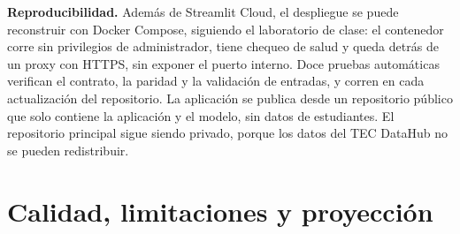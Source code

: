 \documentclass[11pt,a4paper]{article}
\begin{document}
\textbf{Reproducibilidad.} Además de Streamlit Cloud, el despliegue se puede reconstruir con Docker Compose, siguiendo el laboratorio de clase: el contenedor corre sin privilegios de administrador, tiene chequeo de salud y queda detrás de un proxy con HTTPS, sin exponer el puerto interno. Doce pruebas automáticas verifican el contrato, la paridad y la validación de entradas, y corren en cada actualización del repositorio. La aplicación se publica desde un repositorio público que solo contiene la aplicación y el modelo, sin datos de estudiantes. El repositorio principal sigue siendo privado, porque los datos del TEC DataHub no se pueden redistribuir.

\section{Calidad, limitaciones y proyección}
\end{document}
